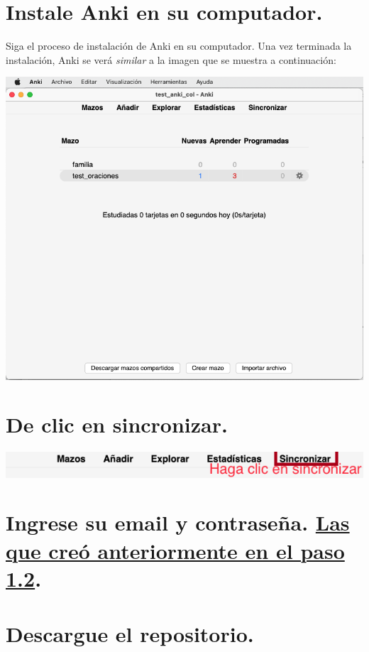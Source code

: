 \documentclass[
]{book}
\begin{document}
\hypertarget{instale-anki-en-su-computador.}{%
\section{Instale Anki en su computador.}\label{instale-anki-en-su-computador.}}

Siga el proceso de instalación de Anki en su computador. Una vez terminada la instalación, Anki se verá \emph{similar} a la imagen que se muestra a continuación:

\includegraphics[width=0.6\linewidth]{images/reposit_sp/anki_screen}

\hypertarget{de-clic-en-sincronizar.}{%
\section{De clic en sincronizar.}\label{de-clic-en-sincronizar.}}

\includegraphics[width=0.6\linewidth]{images/reposit_sp/clic_sincronizar}

\hypertarget{ingrese-su-email-y-contraseuxf1a.-las-que-creuxf3-anteriormente-en-el-paso-1.2.}{%
\section{\texorpdfstring{Ingrese su email y contraseña. \protect\hyperlink{cross_1}{Las que creó anteriormente en el paso 1.2}.}{Ingrese su email y contraseña. Las que creó anteriormente en el paso 1.2.}}\label{ingrese-su-email-y-contraseuxf1a.-las-que-creuxf3-anteriormente-en-el-paso-1.2.}}

\hypertarget{descargue-el-repositorio.}{%
\section{Descargue el repositorio.}\label{descargue-el-repositorio.}}
\end{document}

